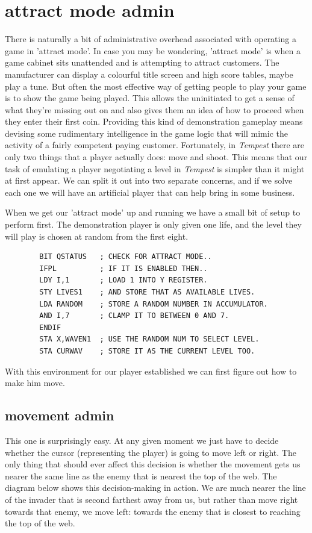 \chapter{attract mode admin}
\label{sec:attract_mode}
\lhead[tempest]{}
\lstset{style=6502Style}

There is naturally a bit of administrative overhead associated with operating
a game in 'attract mode'. In case you may be wondering, 'attract mode' is when a game cabinet
sits unattended and is attempting to attract customers. The manufacturer can display a colourful title
screen and high score tables, maybe play a tune. But often the most effective way of getting
people to play your game is to show the game being played. This allows the uninitiated to get a sense
of what they're missing out on and also gives them an idea of how to proceed when they
enter their first coin.
Providing this kind of demonstration gameplay means devising some rudimentary intelligence in the game logic that will
mimic the activity of a fairly competent paying customer. Fortunately, in \textit{Tempest}
there are only
two things that a player actually does: move and shoot. This means that our task of 
emulating a player negotiating a level in \textit{Tempest} is simpler
than it might at first appear. We can split it out into two separate concerns, and if we solve 
each one we will have an artificial player that can help bring in some business.

When we get our 'attract mode' up and running we have a small bit of setup to
perform first. The demonstration player is only given one life, and the level they
will play is chosen at random from the first eight.
\begin{lstlisting}
        BIT QSTATUS   ; CHECK FOR ATTRACT MODE..
        IFPL          ; IF IT IS ENABLED THEN..
        LDY I,1       ; LOAD 1 INTO Y REGISTER.
        STY LIVES1    ; AND STORE THAT AS AVAILABLE LIVES.
        LDA RANDOM    ; STORE A RANDOM NUMBER IN ACCUMULATOR.
        AND I,7       ; CLAMP IT TO BETWEEN 0 AND 7.
        ENDIF
        STA X,WAVEN1  ; USE THE RANDOM NUM TO SELECT LEVEL.
        STA CURWAV    ; STORE IT AS THE CURRENT LEVEL TOO.
\end{lstlisting}

With this environment for our player established we can first figure out how to make
him move.
\section*{movement admin}
This one is surprisingly easy. At any given moment we just have to decide whether
the cursor (representing the player) is going to move left or right. The only thing
that should ever affect this decision is whether the movement gets us nearer the same
line as the enemy that is nearest the top of the web. The diagram below shows this
decision-making in action. We are much nearer the line of the invader that is second
farthest away from us, but rather than move right towards that enemy, we move left:
towards the enemy that is closest to reaching the top of the web.

